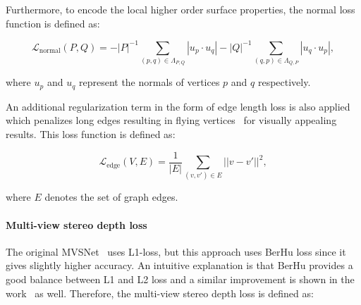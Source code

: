 \noindent Furthermore, to encode the local higher order surface properties, the normal loss function is defined as:

\begin{footnotesize}
\begin{equation}
\mathcal{L}_{\text{normal}}(P, Q) = -|P|^{-1}\!\!\!\!\!\!\!\! \sum_{(p, q) \in \Lambda_{P,Q}}\!\!\!\!\!\!\!\!{|u_p \cdot u_q|} - |Q|^{-1}\!\!\!\!\!\!\!\! \sum_{(q, p) \in \Lambda_{Q,P}}\!\!\!\!\!\!\!\!{|u_q \cdot u_p|},
\end{equation}
\end{footnotesize}

\noindent where $u_p$ and $u_q$ represent the normals of vertices $p$ and $q$ respectively.  

An additional regularization term in the form of edge length loss is also applied which penalizes long edges resulting in flying vertices~\cite{wang2018pixel2mesh} for visually appealing results. This loss function is defined as:

\begin{equation}
\mathcal{L}_{\text{edge}}(V, E) = \frac{1}{|E|} \sum_{(v,v') \in E}{||v - v'||^2},
\end{equation}

\noindent where $E$ denotes the set of graph edges.


\paragraph{Multi-view stereo depth loss}\vspace{-4mm}
The original MVSNet~\cite{yao2018mvsnet} uses L1-loss, but this approach uses BerHu loss since it gives slightly higher accuracy.
An intuitive explanation is that BerHu provides a good balance between L1 and L2 loss and a similar improvement is shown in the work~\cite{laina2016deeper} as well.
Therefore, the multi-view stereo depth loss is defined as:

